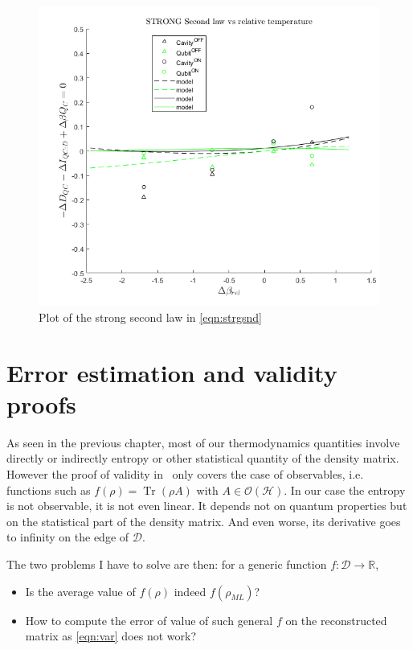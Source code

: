 \documentclass[10pt,a4paper]{report}
\theoremstyle{plain}
\theoremstyle{definition}
\theoremstyle{remark}
\newcommand{\R}{\ensuremath{\mathbb{R}}}
\DeclareMathOperator{\Tr}{Tr}
\newcommand{\ml}{_{M\!L}}
\begin{document}
\begin{figure}
  \centering
  \includegraphics[height=0.45\textheight]{plots/Strg1.png}
  \caption{Plot of the strong second law in \cref{eqn:strgsnd}}\label{fig:strg1}
\end{figure}

\chapter{Error estimation and validity proofs}

As seen in the previous chapter, most of our thermodynamics quantities involve
directly or indirectly entropy or other statistical quantity of the density
matrix. However the proof of validity in~\cite{SPRAL17} only covers the case of
observables, i.e. functions such as $f(\rho) = \Tr(\rho A)$ with $A \in
\mathcal{O}(\mathcal{H})$. In our case the entropy is not observable, it is not even
linear. It depends not on quantum properties but on the statistical part of the
density matrix. And even worse, its derivative goes to infinity on the edge of
$\mathcal{D}$.

The two problems I have to solve are then:
for a generic function $f : \mathcal{D}
\to \R$,
\begin{itemize}
\item Is the average value of $f(\rho)$ indeed $f(\rho\ml)$?
\item How to compute the error of value of such general $f$ on the reconstructed
  matrix as \cref{eqn:var} does not work?
\end{itemize}
\end{document}
